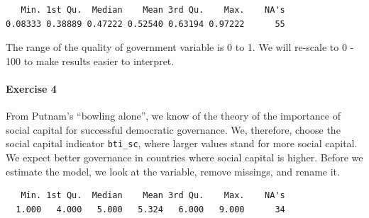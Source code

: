 \documentclass[]{article}
\newenvironment{Shaded}{\begin{snugshade}}{\end{snugshade}}
\newcommand{\KeywordTok}[1]{\textcolor[rgb]{0.13,0.29,0.53}{\textbf{#1}}}
\newcommand{\DecValTok}[1]{\textcolor[rgb]{0.00,0.00,0.81}{#1}}
\newcommand{\StringTok}[1]{\textcolor[rgb]{0.31,0.60,0.02}{#1}}
\newcommand{\CommentTok}[1]{\textcolor[rgb]{0.56,0.35,0.01}{\textit{#1}}}
\newcommand{\OperatorTok}[1]{\textcolor[rgb]{0.81,0.36,0.00}{\textbf{#1}}}
\newcommand{\NormalTok}[1]{#1}
\let\oldparagraph\paragraph
\renewcommand{\paragraph}[1]{\oldparagraph{#1}\mbox{}}
\theoremstyle{definition}
\theoremstyle{definition}
\theoremstyle{definition}
\theoremstyle{remark}
\begin{document}
\begin{verbatim}
   Min. 1st Qu.  Median    Mean 3rd Qu.    Max.    NA's 
0.08333 0.38889 0.47222 0.52540 0.63194 0.97222      55 
\end{verbatim}

\begin{Shaded}
\end{Shaded}

The range of the quality of government variable is 0 to 1. We will
re-scale to 0 - 100 to make results easier to interpret.

\begin{Shaded}
\end{Shaded}

\paragraph{Exercise 4}\label{exercise-4-6}

From Putnam's ``bowling alone'', we know of the theory of the importance
of social capital for successful democratic governance. We, therefore,
choose the social capital indicator \texttt{bti\_sc}, where larger
values stand for more social capital. We expect better governance in
countries where social capital is higher. Before we estimate the model,
we look at the variable, remove missings, and rename it.

\begin{Shaded}
\end{Shaded}

\begin{verbatim}
   Min. 1st Qu.  Median    Mean 3rd Qu.    Max.    NA's 
  1.000   4.000   5.000   5.324   6.000   9.000      34 
\end{verbatim}
\end{document}
